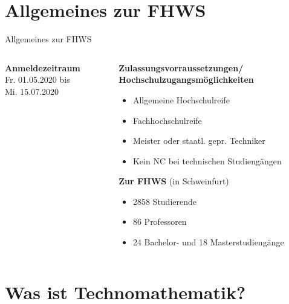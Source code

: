 \documentclass[10pt]{beamer}
\begin{document}
\maketitle
\section{Allgemeines zur FHWS} 

\begin{frame}[fragile]{Allgemeines zur FHWS}
  \begin{columns}
    \begin{column}{.5\textwidth}
      \begin{figure}[ht]  
      \end{figure}
      \textbf{Anmeldezeitraum}\\
      Fr. 01.05.2020 bis \\Mi. 15.07.2020
    \end{column}
  
    \begin{column}{.5\textwidth}
      \textbf{Zulassungsvorraussetzungen/\\Hochschulzugangsmöglichkeiten}
      \begin{itemize}
        \item Allgemeine Hochschulreife
        \item Fachhochschulreife
        \item Meister oder staatl. gepr. Techniker
        \item Kein NC bei technischen Studiengängen
      \end{itemize}
      \textbf{Zur FHWS} (in Schweinfurt)\\
      \begin{itemize}
        \item 2858 Studierende
        \item 86 Professoren
        \item 24 Bachelor- und 18 Masterstudiengänge
      \end{itemize}
    \end{column}
  \end{columns}
\end{frame}

\section{Was ist Technomathematik?}
\end{document}
